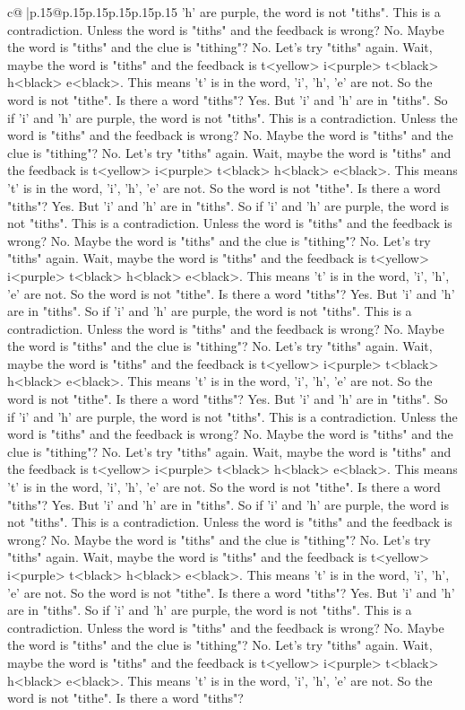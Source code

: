 \documentclass{article}
\begin{document}
{\begin{supertabular}{c@{$\;$}|p{.15\linewidth}@{}p{.15\linewidth}p{.15\linewidth}p{.15\linewidth}p{.15\linewidth}p{.15\linewidth}}
{{{'h' are purple, the word is not "tiths". This is a contradiction. Unless the word is "tiths" and the feedback is wrong? No. Maybe the word is "tiths" and the clue is "tithing"? No. Let's try "tiths" again. Wait, maybe the word is "tiths" and the feedback is t<yellow> i<purple> t<black> h<black> e<black>. This means 't' is in the word, 'i', 'h', 'e' are not. So the word is not "tithe". Is there a word "tiths"? Yes. But 'i' and 'h' are in "tiths". So if 'i' and 'h' are purple, the word is not "tiths". This is a contradiction. Unless the word is "tiths" and the feedback is wrong? No. Maybe the word is "tiths" and the clue is "tithing"? No. Let's try "tiths" again. Wait, maybe the word is "tiths" and the feedback is t<yellow> i<purple> t<black> h<black> e<black>. This means 't' is in the word, 'i', 'h', 'e' are not. So the word is not "tithe". Is there a word "tiths"? Yes. But 'i' and 'h' are in "tiths". So if 'i' and 'h' are purple, the word is not "tiths". This is a contradiction. Unless the word is "tiths" and the feedback is wrong? No. Maybe the word is "tiths" and the clue is "tithing"? No. Let's try "tiths" again. Wait, maybe the word is "tiths" and the feedback is t<yellow> i<purple> t<black> h<black> e<black>. This means 't' is in the word, 'i', 'h', 'e' are not. So the word is not "tithe". Is there a word "tiths"? Yes. But 'i' and 'h' are in "tiths". So if 'i' and 'h' are purple, the word is not "tiths". This is a contradiction. Unless the word is "tiths" and the feedback is wrong? No. Maybe the word is "tiths" and the clue is "tithing"? No. Let's try "tiths" again. Wait, maybe the word is "tiths" and the feedback is t<yellow> i<purple> t<black> h<black> e<black>. This means 't' is in the word, 'i', 'h', 'e' are not. So the word is not "tithe". Is there a word "tiths"? Yes. But 'i' and 'h' are in "tiths". So if 'i' and 'h' are purple, the word is not "tiths". This is a contradiction. Unless the word is "tiths" and the feedback is wrong? No. Maybe the word is "tiths" and the clue is "tithing"? No. Let's try "tiths" again. Wait, maybe the word is "tiths" and the feedback is t<yellow> i<purple> t<black> h<black> e<black>. This means 't' is in the word, 'i', 'h', 'e' are not. So the word is not "tithe". Is there a word "tiths"? Yes. But 'i' and 'h' are in "tiths". So if 'i' and 'h' are purple, the word is not "tiths". This is a contradiction. Unless the word is "tiths" and the feedback is wrong? No. Maybe the word is "tiths" and the clue is "tithing"? No. Let's try "tiths" again. Wait, maybe the word is "tiths" and the feedback is t<yellow> i<purple> t<black> h<black> e<black>. This means 't' is in the word, 'i', 'h', 'e' are not. So the word is not "tithe". Is there a word "tiths"? Yes. But 'i' and 'h' are in "tiths". So if 'i' and 'h' are purple, the word is not "tiths". This is a contradiction. Unless the word is "tiths" and the feedback is wrong? No. Maybe the word is "tiths" and the clue is "tithing"? No. Let's try "tiths" again. Wait, maybe the word is "tiths" and the feedback is t<yellow> i<purple> t<black> h<black> e<black>. This means 't' is in the word, 'i', 'h', 'e' are not. So the word is not "tithe". Is there a word "tiths"? }}}
\end{supertabular}}
\end{document}
